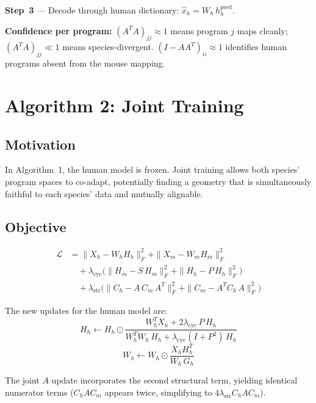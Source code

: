\documentclass[10pt,twocolumn,letterpaper]{article}
\begin{document}
\textbf{Step~3} --- Decode through human dictionary:
$\hat{x}_h = W_h\,h_h^{\text{pred}}$.

\textbf{Confidence per program:} $(A^T A)_{jj} \approx 1$ means program $j$
maps cleanly; $(A^T A)_{jj} \ll 1$ means species-divergent.
$(I - AA^T)_{ii} \approx 1$ identifies human programs absent from the mouse
mapping.

\section{Algorithm 2: Joint Training}

\subsection{Motivation}

In Algorithm~1, the human model is frozen. Joint training allows both species'
program spaces to co-adapt, potentially finding a geometry that is
simultaneously faithful to each species' data and mutually alignable.

\subsection{Objective}

\begin{align}
  \mathcal{L} &= \|X_h - W_h H_h\|_F^2 + \|X_m - W_m H_m\|_F^2 \nonumber\\
  &\quad + \lambda_{\text{cyc}} \big(
    \|H_m - S\,H_m\|_F^2 + \|H_h - P\,H_h\|_F^2
  \big) \nonumber\\
  &\quad + \lambda_{\text{str}} \big(
    \|C_h - A\,C_m\,A^T\|_F^2
    + \|C_m - A^T C_h\,A\|_F^2
  \big)
\end{align}

The new updates for the human model are:
\begin{equation}
  H_h \leftarrow H_h \odot
    \frac{W_h^T X_h + 2\lambda_{\text{cyc}}\,P\,H_h}
         {W_h^T W_h\,H_h + \lambda_{\text{cyc}}(I + P^2)\,H_h}
\end{equation}
\begin{equation}
  W_h \leftarrow W_h \odot \frac{X_h H_h^T}{W_h\,G_h}
\end{equation}

The joint $A$ update incorporates the second structural term, yielding
identical numerator terms ($C_h A C_m$ appears twice, simplifying to
$4\lambda_{\text{str}} C_h A C_m$).
\end{document}
